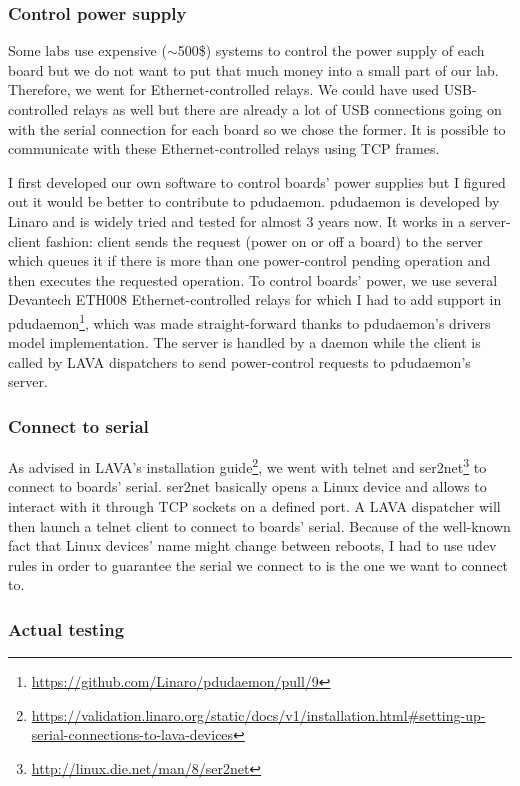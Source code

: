 \subsubsection{Control power supply}

Some labs use expensive ($\sim$500\$) systems to control the power supply of each board but we do not want to put that much money into a small part of our lab. Therefore, we went for Ethernet-controlled relays. We could have used USB-controlled relays as well but there are already a lot of USB connections going on with the serial connection for each board so we chose the former. It is possible to communicate with these Ethernet-controlled relays using TCP frames.

I first developed our own software to control boards' power supplies but I figured out it would be better to contribute to pdudaemon. pdudaemon is developed by Linaro and is widely tried and tested for almost 3 years now. It works in a server-client fashion: client sends the request (power on or off a board) to the server which queues it if there is more than one power-control pending operation and then executes the requested operation. To control boards' power, we use several Devantech ETH008 Ethernet-controlled relays for which I had to add support in pdudaemon\footnote{\url{https://github.com/Linaro/pdudaemon/pull/9}}, which was made straight-forward thanks to pdudaemon's drivers model implementation. The server is handled by a daemon while the client is called by LAVA dispatchers to send power-control requests to pdudaemon's server.

\subsubsection{Connect to serial}

As advised in LAVA's installation guide\footnote{\url{https://validation.linaro.org/static/docs/v1/installation.html\#setting-up-serial-connections-to-lava-devices}}, we went with telnet and ser2net\footnote{\url{http://linux.die.net/man/8/ser2net}} to connect to boards' serial. ser2net basically opens a Linux device and allows to interact with it through TCP sockets on a defined port. A LAVA dispatcher will then launch a telnet client to connect to boards' serial. Because of the well-known fact that Linux devices' name might change between reboots, I had to use udev rules in order to guarantee the serial we connect to is the one we want to connect to.

\subsubsection{Actual testing}


